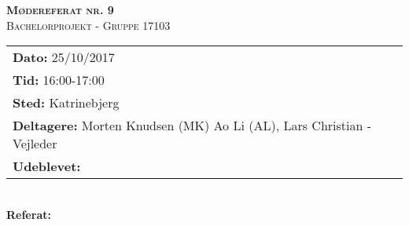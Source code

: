 
\newcommand{\HRule}{\rule{\linewidth}{0.1mm}}


	\begin{center}
		{\huge \bfseries \textsc{Mødereferat nr. 9}}\\
		\textsc{\large Bachelorprojekt - Gruppe 17103}\\[0.3cm]
	\end{center}
	\begin{tabular}{ll}
	\large \textbf{Dato:} 25/10/2017  	\\ %
	\large \textbf{Tid:}  16:00-17:00 	\\ %
	\large \textbf{Sted:} Katrinebjerg		\\ %
	\large \textbf{Deltagere:} Morten Knudsen (MK) Ao Li (AL), Lars Christian - Vejleder \\
	\large \textbf{Udeblevet:} 
	\end{tabular}\\
	\phantom{\,}\hspace{0.1em} \large \textbf{Referat:}
